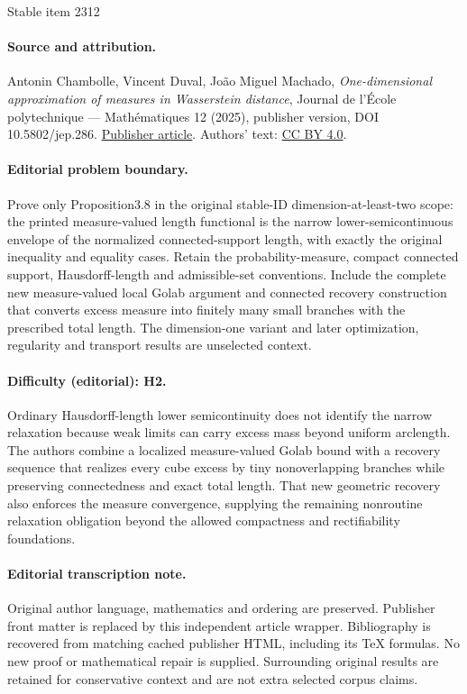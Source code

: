\documentclass[11pt]{article}
\numberwithin{equation}{section}
\theoremstyle{definition}
\begin{document}
\begin{center}{\Large Stable item 2312}\end{center}
\paragraph{Source and attribution.}
Antonin Chambolle, Vincent Duval, João Miguel Machado, \emph{One-dimensional approximation of measures in Wasserstein distance}, Journal de l’École polytechnique — Mathématiques 12 (2025), publisher version, DOI 10.5802/jep.286. \href{https://jep.centre-mersenne.org/articles/10.5802/jep.286/}{Publisher article}. Authors' text: \href{https://creativecommons.org/licenses/by/4.0/}{CC BY 4.0}.
\paragraph{Editorial problem boundary.}
Prove only Proposition3.8 in the original stable-ID dimension-at-least-two scope: the printed measure-valued length functional is the narrow lower-semicontinuous envelope of the normalized connected-support length, with exactly the original inequality and equality cases. Retain the probability-measure, compact connected support, Hausdorff-length and admissible-set conventions. Include the complete new measure-valued local Golab argument and connected recovery construction that converts excess measure into finitely many small branches with the prescribed total length. The dimension-one variant and later optimization, regularity and transport results are unselected context.
\paragraph{Difficulty (editorial): H2.}
Ordinary Hausdorff-length lower semicontinuity does not identify the narrow relaxation because weak limits can carry excess mass beyond uniform arclength. The authors combine a localized measure-valued Golab bound with a recovery sequence that realizes every cube excess by tiny nonoverlapping branches while preserving connectedness and exact total length. That new geometric recovery also enforces the measure convergence, supplying the remaining nonroutine relaxation obligation beyond the allowed compactness and rectifiability foundations.
\paragraph{Editorial transcription note.}
Original author language, mathematics and ordering are preserved. Publisher front matter is replaced by this independent article wrapper. Bibliography is recovered from matching cached publisher HTML, including its TeX formulas. No new proof or mathematical repair is supplied. Surrounding original results are retained for conservative context and are not extra selected corpus claims.
\clearpage
\end{document}
